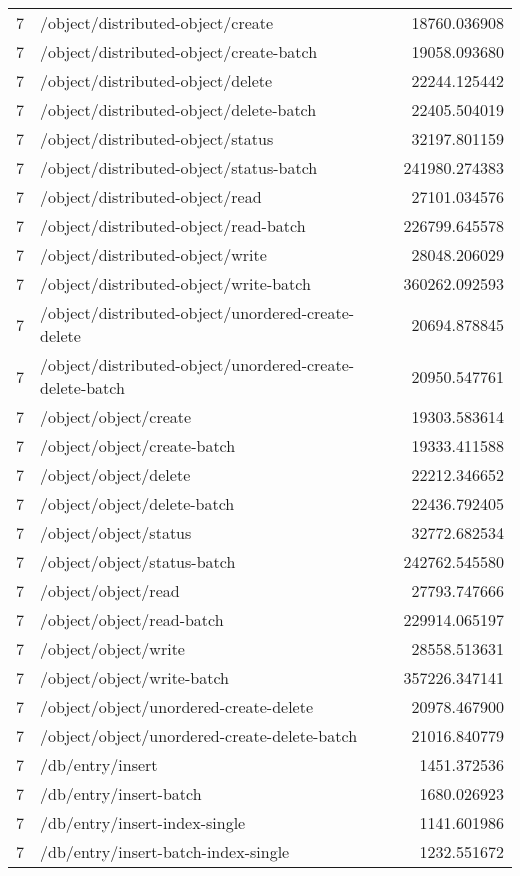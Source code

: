 \begin{longtable}{rlr}
7 & /object/distributed-object/create & 18760.036908 \\
7 & /object/distributed-object/create-batch & 19058.093680 \\
7 & /object/distributed-object/delete & 22244.125442 \\
7 & /object/distributed-object/delete-batch & 22405.504019 \\
7 & /object/distributed-object/status & 32197.801159 \\
7 & /object/distributed-object/status-batch & 241980.274383 \\
7 & /object/distributed-object/read & 27101.034576 \\
7 & /object/distributed-object/read-batch & 226799.645578 \\
7 & /object/distributed-object/write & 28048.206029 \\
7 & /object/distributed-object/write-batch & 360262.092593 \\
7 & /object/distributed-object/unordered-create-delete & 20694.878845 \\
7 & /object/distributed-object/unordered-create-delete-batch & 20950.547761 \\
7 & /object/object/create & 19303.583614 \\
7 & /object/object/create-batch & 19333.411588 \\
7 & /object/object/delete & 22212.346652 \\
7 & /object/object/delete-batch & 22436.792405 \\
7 & /object/object/status & 32772.682534 \\
7 & /object/object/status-batch & 242762.545580 \\
7 & /object/object/read & 27793.747666 \\
7 & /object/object/read-batch & 229914.065197 \\
7 & /object/object/write & 28558.513631 \\
7 & /object/object/write-batch & 357226.347141 \\
7 & /object/object/unordered-create-delete & 20978.467900 \\
7 & /object/object/unordered-create-delete-batch & 21016.840779 \\
7 & /db/entry/insert & 1451.372536 \\
7 & /db/entry/insert-batch & 1680.026923 \\
7 & /db/entry/insert-index-single & 1141.601986 \\
7 & /db/entry/insert-batch-index-single & 1232.551672 \\

\end{longtable}

